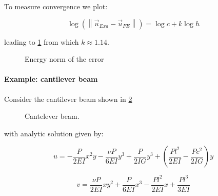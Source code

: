 To measure convergence we plot:

\[\log \left( {\left\| {{{\vec u}_{Exa}} - {{\vec u}_{FE}}} \right\|} \right) = \log c + k\log h\]

leading to \cref{fig:conv} from which  $k \approx 1.14.$

\begin{figure}[H]
\centering
{}
\caption{Energy norm of the error}
\label{fig:conv}
\end{figure}

\newpage


\paragraph*{Example: cantilever beam}
Consider the cantilever beam shown in \cref{fig:viga}

\begin{figure}[H]
\centering
{}
\caption{Cantelever beam.}
\label{fig:viga}
\end{figure}

with analytic solution \citep{book:timoshenko} given by:

\[u =  - \frac{P}{{2EI}}{x^2}y - \frac{{\nu P}}{{6EI}}{y^3} + \frac{P}{{2IG}}{y^3} + \left( {\frac{{P{l^2}}}{{2EI}} - \frac{{P{c^2}}}{{2IG}}} \right)y\]

\[v = \frac{{\nu P}}{{2EI}}x{y^2} + \frac{P}{{6EI}}{x^3} - \frac{{P{l^2}}}{{2EI}}x + \frac{{P{l^3}}}{{3EI}}\]

